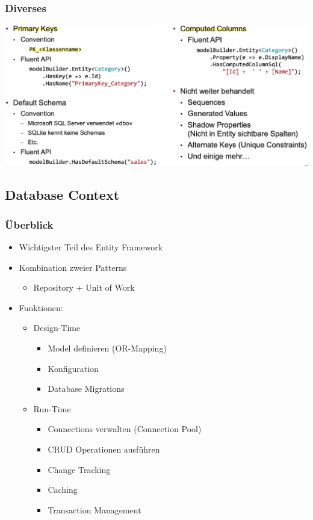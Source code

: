 \subsubsection{Diverses}
\begin{center}
    \includegraphics[scale=.33]{graphic/efc/Diverses.png}
\end{center}
\vspace{-8pt}


\subsection{Database Context}

\subsubsection{Überblick}
\begin{itemize}
    \item Wichtigster Teil des Entity Framework
    \item Kombination zweier Patterns
    \begin{itemize}
        \item Repository + Unit of Work
    \end{itemize}
    \item Funktionen:
    \begin{itemize}
        \item Design-Time
        \begin{itemize}
            \item Model definieren (OR-Mapping)
            \item Konfiguration
            \item Database Migrations
        \end{itemize}
        \item Run-Time
        \begin{itemize}
            \item Connections verwalten (Connection Pool)
            \item CRUD Operationen ausführen
            \item Change Tracking
            \item Caching
            \item Transaction Management
        \end{itemize}
    \end{itemize}
\end{itemize}

